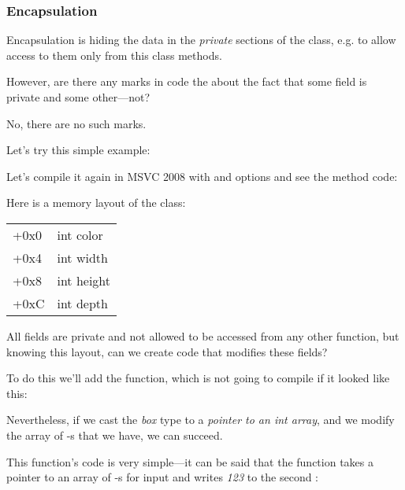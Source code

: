 \subsubsection{Encapsulation}

Encapsulation is hiding the data in the \emph{private} sections of the class, 
e.g. to allow access to them only from this class methods.

However, are there any marks in code the about the fact that some field is private and
some other---not?

No, there are no such marks.

Let's try this simple example:



Let's compile it again in MSVC 2008 with \Ox and \Obzero options and see the  method code:



Here is a memory layout of the class:

\begin{center}
\begin{tabular}{ | l | l | }
\hline
  \tableheader{} \\
\hline
  +0x0 & int color \\
\hline
  +0x4 & int width \\
\hline
  +0x8 & int height \\
\hline
  +0xC & int depth \\
\hline
\end{tabular}
\end{center}

All fields are private and not allowed to be accessed from any other
function, but knowing this layout, can we create code that modifies these fields? 

To do this we'll add the  function, 
which is not going to compile if it looked like this:



Nevertheless, if we cast the \emph{box} type to a \emph{pointer to an int array},
and we modify the array of \Tint{}-s that we have, we can succeed.



This function's code is very simple---it can be said that the function takes a pointer to an array of \Tint{}-s for input
and writes \emph{123} to the second \Tint{}:

